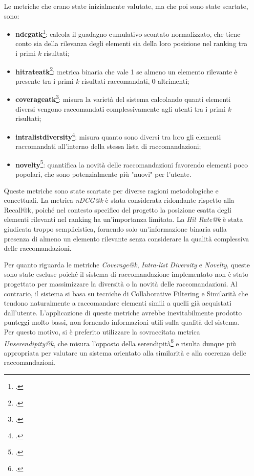 Le metriche che erano state inizialmente valutate, ma che poi sono state scartate, sono:
\begin{itemize}
    \item \textbf{\gls{ndcgatk}}\footcite{site:ndcg}: calcola il guadagno cumulativo scontato normalizzato, che tiene conto sia della rilevanza degli elementi sia della loro posizione nel ranking tra i primi $k$ risultati;
    \item \textbf{\gls{hitrateatk}}\footcite{site:hit_rate}: metrica binaria che vale 1 se almeno un elemento rilevante è presente tra i primi $k$ risultati raccomandati, 0 altrimenti;
    \item \textbf{\gls{coverageatk}}\footcite{site:coverage_metric}: misura la varietà del sistema calcolando quanti elementi diversi vengono raccomandati complessivamente agli utenti tra i primi $k$ risultati;
    \item \textbf{\gls{intralistdiversity}}\footcite{article:diversity_metric}: misura quanto sono diversi tra loro gli elementi raccomandati all'interno della stessa lista di raccomandazioni;
    \item \textbf{\gls{novelty}}\footcite{site:novelty_metric}: quantifica la novità delle raccomandazioni favorendo elementi poco popolari, che sono potenzialmente più "nuovi" per l'utente.
\end{itemize}

Queste metriche sono state scartate per diverse ragioni metodologiche e concettuali. La metrica \emph{nDCG@k} è stata considerata ridondante rispetto alla Recall@k, poiché nel contesto specifico del progetto la posizione esatta degli elementi rilevanti nel ranking ha un'importanza limitata. La \emph{Hit Rate@k} è stata giudicata troppo semplicistica, fornendo solo un'informazione binaria sulla presenza di almeno un elemento rilevante senza considerare la qualità complessiva delle raccomandazioni.

Per quanto riguarda le metriche \emph{Coverage@k}, \emph{Intra-list Diversity} e \emph{Novelty}, queste sono state escluse poiché il sistema di raccomandazione implementato non è stato progettato per massimizzare la diversità o la novità delle raccomandazioni. Al contrario, il sistema si basa su tecniche di Collaborative Filtering e Similarità che tendono naturalmente a raccomandare elementi simili a quelli già acquistati dall'utente. L'applicazione di queste metriche avrebbe inevitabilmente prodotto punteggi molto bassi, non fornendo informazioni utili sulla qualità del sistema. Per questo motivo, si è preferito utilizzare la sovraccitata metrica \emph{Unserendipity@k}, che misura l'opposto della serendipità\footcite{site:serendipity} e risulta dunque più appropriata per valutare un sistema orientato alla similarità e alla coerenza delle raccomandazioni.


